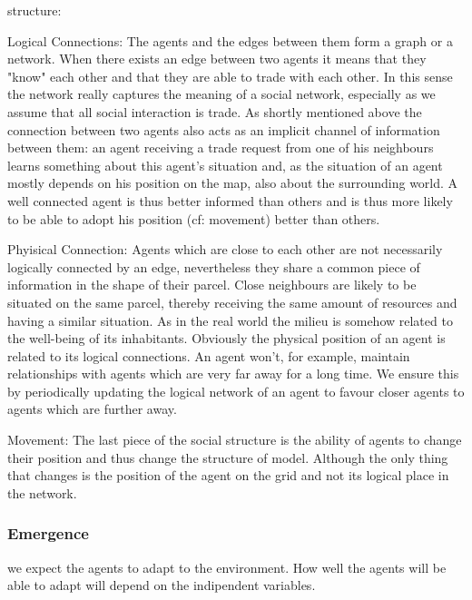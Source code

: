 \documentclass{JASSS}
\begin{document}
	structure:
	\begin{description*}
		\item[Logical Connections:]
			The agents and the edges between them form a graph or a network. When there exists an edge between two agents it means that they "know" each other and that they are able to trade with each other. In this sense the network really captures the meaning of a social network, especially as we assume that all social interaction is trade. As shortly mentioned above the connection between two agents also acts as an implicit channel of information between them: an agent receiving a trade request from one of his neighbours learns something about this agent's situation and, as the situation of an agent mostly depends on his position on the map, also about the surrounding world. A well connected agent is thus better informed than others and is thus more likely to be able to adopt his position (cf: movement) better than others.
			
		\item[Phyisical Connection:]
			Agents which are close to each other are not necessarily logically connected by an edge, nevertheless they share a common piece of information in the shape of their parcel. Close neighbours are likely to be situated on the same parcel, thereby receiving the same amount of resources and having a similar situation. As in the real world the milieu is somehow related to the well-being of its inhabitants. Obviously the physical position of an agent is related to its logical connections. An agent won't, for example, maintain relationships with agents which are very far away for a long time. We ensure this by periodically updating the logical network of an agent to favour closer agents to agents which are further away.
			
		\item[Movement:]
			The last piece of the social structure is the ability of agents to change their position and thus change the structure of model. Although the only thing that changes is the position of the agent on the grid and not its logical place in the network. 
	\end{description*}
	

\subsubsection{Emergence}
	we expect the agents to adapt to the environment. How well the agents will be able to adapt will depend on the indipendent variables.
\end{document}
